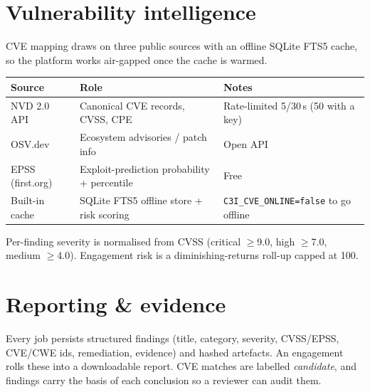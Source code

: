 \documentclass[11pt]{article}
\newif\ifintable\intablefalse
\newcommand{\code}[1]{\ifintable\texttt{#1}\else{\small\colorbox{codebg}{\texttt{#1}}}\fi}
\begin{document}
\section{Vulnerability intelligence}
CVE mapping draws on three public sources with an offline SQLite FTS5 cache, so
the platform works air-gapped once the cache is warmed.
\begin{table}[h]
\centering\footnotesize\intabletrue
\begin{tabularx}{\textwidth}{@{}L{3.2cm} L{4.6cm} X@{}}
\toprule
\textbf{Source} & \textbf{Role} & \textbf{Notes}\\
\midrule
NVD 2.0 API & Canonical CVE records, CVSS, CPE & Rate-limited 5/30\,s (50 with a key)\\
OSV.dev & Ecosystem advisories / patch info & Open API\\
EPSS (first.org) & Exploit-prediction probability + percentile & Free\\
Built-in cache & SQLite FTS5 offline store + risk scoring & \code{C3I\_CVE\_ONLINE=false} to go offline\\
\bottomrule
\end{tabularx}
\end{table}
Per-finding severity is normalised from CVSS (critical $\ge$9.0, high $\ge$7.0,
medium $\ge$4.0). Engagement risk is a diminishing-returns roll-up capped at 100.

\section{Reporting \& evidence}
Every job persists structured findings (title, category, severity, CVSS/EPSS,
CVE/CWE ids, remediation, evidence) and hashed artefacts. An engagement rolls
these into a downloadable report. CVE matches are labelled \emph{candidate}, and
findings carry the basis of each conclusion so a reviewer can audit them.

\end{document}
